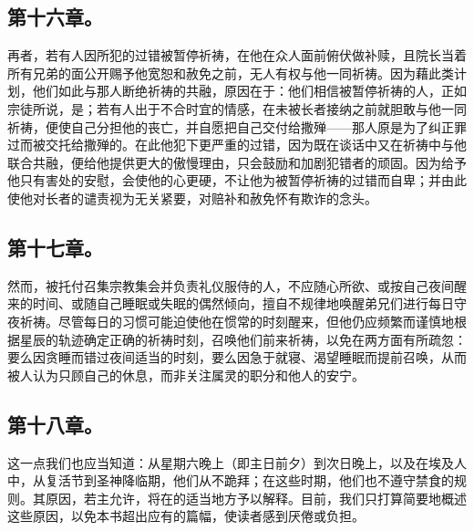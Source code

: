 \subsection{第十六章。}

\par

再者，若有人因所犯的过错被暂停祈祷，在他在众人面前俯伏做补赎，且院长当着所有兄弟的面公开赐予他宽恕和赦免之前，无人有权与他一同祈祷。因为藉此类计划，他们如此与那人断绝祈祷的共融，原因在于：他们相信被暂停祈祷的人，正如宗徒所说，是；若有人出于不合时宜的情感，在未被长者接纳之前就胆敢与他一同祈祷，便使自己分担他的丧亡，并自愿把自己交付给撒殚——那人原是为了纠正罪过而被交托给撒殚的。在此他犯下更严重的过错，因为既在谈话中又在祈祷中与他联合共融，便给他提供更大的傲慢理由，只会鼓励和加剧犯错者的顽固。因为给予他只有害处的安慰，会使他的心更硬，不让他为被暂停祈祷的过错而自卑；并由此使他对长者的谴责视为无关紧要，对赔补和赦免怀有欺诈的念头。\par


\subsection{第十七章。}

\par

然而，被托付召集宗教集会并负责礼仪服侍的人，不应随心所欲、或按自己夜间醒来的时间、或随自己睡眠或失眠的偶然倾向，擅自不规律地唤醒弟兄们进行每日守夜祈祷。尽管每日的习惯可能迫使他在惯常的时刻醒来，但他仍应频繁而谨慎地根据星辰的轨迹确定正确的祈祷时刻，召唤他们前来祈祷，以免在两方面有所疏忽：要么因贪睡而错过夜间适当的时刻，要么因急于就寝、渴望睡眠而提前召唤，从而被人认为只顾自己的休息，而非关注属灵的职分和他人的安宁。\par


\subsection{第十八章。}

\par

这一点我们也应当知道：从星期六晚上（即主日前夕）到次日晚上，以及在埃及人中，从复活节到圣神降临期，他们从不跪拜；在这些时期，他们也不遵守禁食的规则。其原因，若主允许，将在的适当地方予以解释。目前，我们只打算简要地概述这些原因，以免本书超出应有的篇幅，使读者感到厌倦或负担。\par

